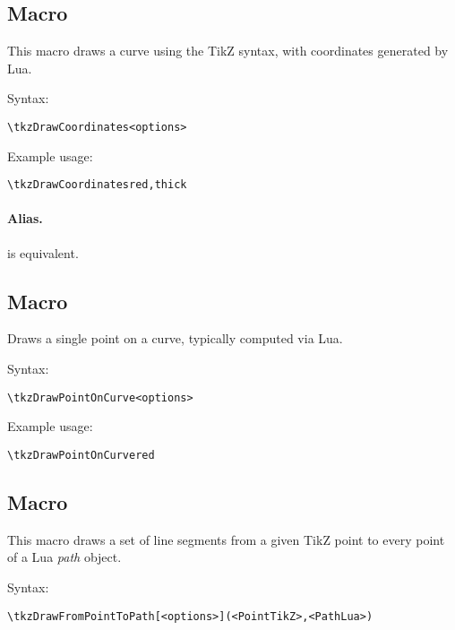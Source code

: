 \subsection{Macro }
This macro draws a curve using the TikZ  syntax, with coordinates generated by Lua.

\medskip
\noindent
Syntax:

\begin{verbatim}
\tkzDrawCoordinates<options>
\end{verbatim}

\noindent
Example usage:

\begin{mybox}
\begin{verbatim}
\tkzDrawCoordinatesred,thick
\end{verbatim}
\end{mybox}

\paragraph{Alias.}  is equivalent.

\subsection{Macro }

Draws a single point on a curve, typically computed via Lua.

\medskip
\noindent
Syntax:

\begin{verbatim}
\tkzDrawPointOnCurve<options>
\end{verbatim}

\noindent
Example usage:

\begin{mybox}
\begin{verbatim}
\tkzDrawPointOnCurvered
\end{verbatim}
\end{mybox}

\subsection{Macro }
This macro draws a set of line segments from a given TikZ point to every point of a Lua \emph{path} object.

\medskip
\noindent
Syntax:
\begin{verbatim}
\tkzDrawFromPointToPath[<options>](<PointTikZ>,<PathLua>)
\end{verbatim}

